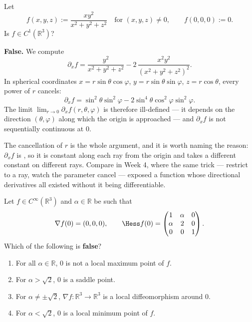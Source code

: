 \begin{question}
\label{q:week08_q4}
Let
\[f(x,y,z) := \frac{xy^2}{x^2+y^2+z^2} \quad \text{for } (x,y,z) \neq 0, \qquad f(0,0,0) := 0.\]
Is $f \in C^1(\mathbb{R}^3)$?
\end{question}

\begin{answer}
\textbf{False.} We compute
\[\partial_xf = \frac{y^2}{x^2+y^2+z^2} - 2\,\frac{x^2y^2}{(x^2+y^2+z^2)^2}.\]
In spherical coordinates $x = r\sin\theta\cos\varphi$, $y = r\sin\theta\sin\varphi$,
$z = r\cos\theta$, every power of $r$ cancels:
\[\partial_xf = \sin^2\theta\sin^2\varphi - 2\sin^4\theta\cos^2\varphi\sin^2\varphi.\]
The limit $\lim_{r\to0}\partial_xf(r,\theta,\varphi)$ is therefore ill-defined --- it depends on
the direction $(\theta,\varphi)$ along which the origin is approached --- and $\partial_xf$ is
not sequentially continuous at $0$.
\end{answer}

\begin{ainote}
The cancellation of $r$ is the whole argument, and it is worth naming the reason: $\partial_xf$
is , so it is constant along each ray from the origin and
takes a different constant on different rays. Compare
 in Week 4, where the same trick --- restrict to a
ray, watch the parameter cancel --- exposed a function whose directional derivatives all existed
without it being differentiable.
\end{ainote}

\begin{question}
\label{q:week08_q5}
Let $f \in C^\infty(\mathbb{R}^3)$ and $\alpha \in \mathbb{R}$ be such that
\[\nabla f(0) = (0,0,0), \qquad
\Hess f(0) = \begin{pmatrix} 1 & \alpha & 0 \\ \alpha & 2 & 0 \\ 0 & 0 & 1\end{pmatrix}.\]
Which of the following is \textbf{false}?
\begin{enumerate}[label=\textbf{(\alph*)}]
  \item For all $\alpha \in \mathbb{R}$, $0$ is not a local maximum point of $f$.
  \item For $\alpha > \sqrt2$, $0$ is a saddle point.
  \item For $\alpha \neq \pm\sqrt2$, $\nabla f : \mathbb{R}^3 \to \mathbb{R}^3$ is a local
    diffeomorphism around $0$.
  \item For $\alpha < \sqrt2$, $0$ is a local minimum point of $f$.
\end{enumerate}
\end{question}

